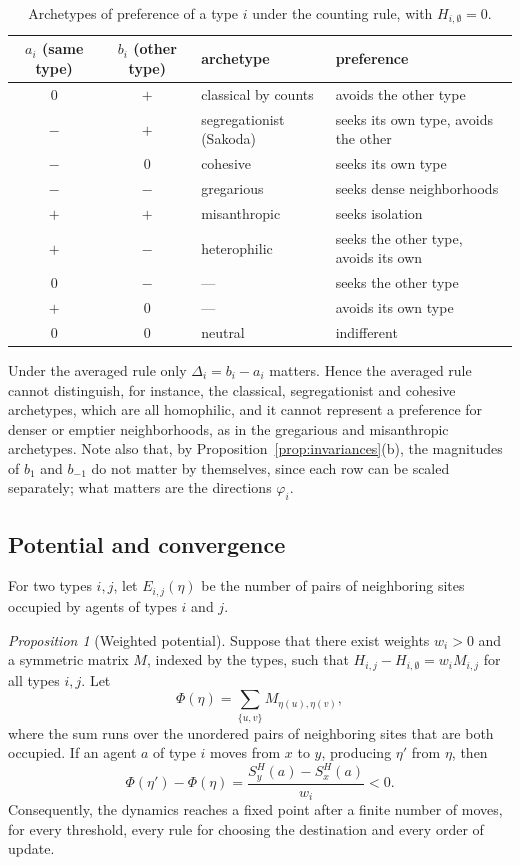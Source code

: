 \documentclass{article}
\theoremstyle{remark}
\newtheorem{proposition}{Proposition}
\begin{document}
\begin{table}[h!]
\centering
\begin{tabular}{|c|c|l|l|}
\hline
$a_i$ (same type) & $b_i$ (other type) & archetype & preference \\
\hline
$0$ & $+$ & classical by counts & avoids the other type \\
$-$ & $+$ & segregationist (Sakoda) & seeks its own type, avoids the other \\
$-$ & $0$ & cohesive & seeks its own type \\
$-$ & $-$ & gregarious & seeks dense neighborhoods \\
$+$ & $+$ & misanthropic & seeks isolation \\
$+$ & $-$ & heterophilic & seeks the other type, avoids its own \\
$0$ & $-$ & --- & seeks the other type \\
$+$ & $0$ & --- & avoids its own type \\
$0$ & $0$ & neutral & indifferent \\
\hline
\end{tabular}
\caption{Archetypes of preference of a type $i$ under the counting rule, with $H_{i,\emptyset}=0$.}
\label{tab:archetypes}
\end{table}

Under the averaged rule only $\Delta_i=b_i-a_i$ matters. Hence the averaged rule cannot distinguish, for instance, the classical, segregationist and cohesive archetypes, which are all homophilic, and it cannot represent a preference for denser or emptier neighborhoods, as in the gregarious and misanthropic archetypes. Note also that, by Proposition~\ref{prop:invariances}(b), the magnitudes of $b_1$ and $b_{-1}$ do not matter by themselves, since each row can be scaled separately; what matters are the directions $\varphi_i$.

\subsection{Potential and convergence}

For two types $i,j$, let $E_{i,j}(\eta)$ be the number of pairs of neighboring sites occupied by agents of types $i$ and $j$.

\begin{proposition}[Weighted potential]\label{prop:potential}
Suppose that there exist weights $w_i>0$ and a symmetric matrix $M$, indexed by the types, such that $H_{i,j}-H_{i,\emptyset}=w_i M_{i,j}$ for all types $i,j$. Let
\[
\Phi(\eta)=\sum_{\{u,v\}} M_{\eta(u),\eta(v)},
\]
where the sum runs over the unordered pairs of neighboring sites that are both occupied. If an agent $a$ of type $i$ moves from $x$ to $y$, producing $\eta'$ from $\eta$, then
\[
\Phi(\eta')-\Phi(\eta)=\frac{S_y^H(a)-S_x^H(a)}{w_i}<0.
\]
Consequently, the dynamics reaches a fixed point after a finite number of moves, for every threshold, every rule for choosing the destination and every order of update.
\end{proposition}
\end{document}
